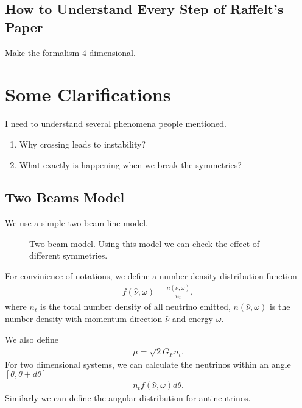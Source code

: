 \documentclass[letterpaper,12pt,english]{sphinxmanual}
\begin{document}
\subsection{How to Understand Every Step of Raffelt's Paper}
\label{\detokenize{collective/directional-instability:how-to-understand-every-step-of-raffelt-s-paper}}
Make the formalism 4 dimensional.


\section{Some Clarifications}
\label{\detokenize{collective/some-clarifications::doc}}\label{\detokenize{collective/some-clarifications:some-clarifications}}
I need to understand several phenomena people mentioned.
\begin{enumerate}
\item {} 
Why crossing leads to instability?

\item {} 
What exactly is happening when we break the symmetries?

\end{enumerate}


\subsection{Two Beams Model}
\label{\detokenize{collective/some-clarifications:two-beams-model}}\label{\detokenize{collective/some-clarifications:id1}}
We use a simple two-beam line model.
\begin{figure}[htbp]
\centering
\capstart

\noindent{}
\caption{Two-beam model. Using this model we can check the effect of different symmetries.}\label{\detokenize{collective/some-clarifications:id2}}\end{figure}

For convinience of notations, we define a number density distribution function
\begin{equation*}
\begin{split}f(\hat\nu,\omega)= \frac{n(\hat \nu,\omega)}{n_t},\end{split}
\end{equation*}
where \(n_t\) is the total number density of all neutrino emitted, \(n(\hat\nu,\omega)\) is the number density with momentum direction \(\hat \nu\) and energy \(\omega\).

We also define
\begin{equation*}
\begin{split}\mu = \sqrt{2}G_F n_t.\end{split}
\end{equation*}
For two dimensional systems, we can calculate the neutrinos within an angle \([\theta,\theta+d\theta]\)
\begin{equation*}
\begin{split}n_t f(\hat\nu,\omega) d\theta.\end{split}
\end{equation*}
Similarly we can define the angular distribution for antineutrinos.
\end{document}
